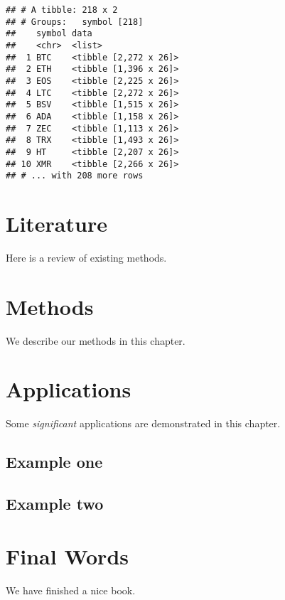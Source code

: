 \documentclass[
]{book}
\begin{document}
\begin{verbatim}
## # A tibble: 218 x 2
## # Groups:   symbol [218]
##    symbol data                 
##    <chr>  <list>               
##  1 BTC    <tibble [2,272 x 26]>
##  2 ETH    <tibble [1,396 x 26]>
##  3 EOS    <tibble [2,225 x 26]>
##  4 LTC    <tibble [2,272 x 26]>
##  5 BSV    <tibble [1,515 x 26]>
##  6 ADA    <tibble [1,158 x 26]>
##  7 ZEC    <tibble [1,113 x 26]>
##  8 TRX    <tibble [1,493 x 26]>
##  9 HT     <tibble [2,207 x 26]>
## 10 XMR    <tibble [2,266 x 26]>
## # ... with 208 more rows
\end{verbatim}

\hypertarget{literature}{%
\chapter{Literature}\label{literature}}

Here is a review of existing methods.

\hypertarget{methods}{%
\chapter{Methods}\label{methods}}

We describe our methods in this chapter.

\hypertarget{applications}{%
\chapter{Applications}\label{applications}}

Some \emph{significant} applications are demonstrated in this chapter.

\hypertarget{example-one}{%
\section{Example one}\label{example-one}}

\hypertarget{example-two}{%
\section{Example two}\label{example-two}}

\hypertarget{final-words}{%
\chapter{Final Words}\label{final-words}}

We have finished a nice book.

  
\end{document}
